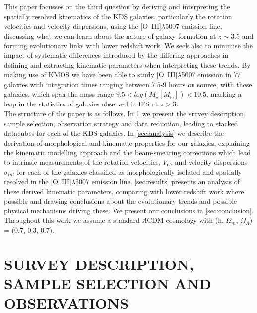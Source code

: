 \documentclass[fleqn,usenatbib]{mn2e}
\begin{document}
This paper focusses on the third question by deriving and interpreting the spatially resolved kinematics of the KDS galaxies, particularly the rotation velocities and velocity dispersions, using the [O~{\sc III}]$\lambda$5007 emission line, discussing what we can learn about the nature of galaxy formation at $z \sim 3.5$ and forming evolutionary links with lower redshift work.
We seek also to minimise the impact of systematic differences introduced by the differing approaches in defining and extracting kinematic parameters when interpreting these trends.  
By making use of KMOS we have been able to study [O~{\sc III}]$\lambda$5007 emission in 77 galaxies with integration times ranging between 7.5-9 hours on source, with these galaxies, which span the mass range $9.5 < log(M_{\star}[M_{\odot}]) < 10.5$, marking a leap in the statistics of galaxies observed in IFS at $z > 3$. \\

The structure of the paper is as follows. In \cref{sec:Survey_and_data} we present the survey description, sample selection, observation strategy and data reduction, leading to stacked datacubes for each of the KDS galaxies.
In \cref{sec:analysis} we describe the derivation of morphological and kinematic properties for our galaxies, explaining the kinematic modelling approach and the beam-smearing corrections which lead to intrinsic measurements of the rotation velocities, $V_{C}$, and velocity dispersions $\sigma_{int}$ for each of the galaxies classified as morphologically isolated and spatially resolved in the [O~{\sc III}]$\lambda$5007 emission line.
\cref{sec:results} presents an analysis of these derived kinematic parameters, comparing with lower redshift work where possible and drawing conclusions about the evolutionary trends and possible physical mechanisms driving these.
We present our conclusions in \cref{sec:conclusion}.
Throughout this work we assume a standard $\Lambda$CDM cosmology with (h, $\Omega_{m}$, $\Omega_{\Lambda}$) = (0.7, 0.3, 0.7). 

\section{SURVEY DESCRIPTION, SAMPLE SELECTION AND OBSERVATIONS}\label{sec:Survey_and_data}
\end{document}
